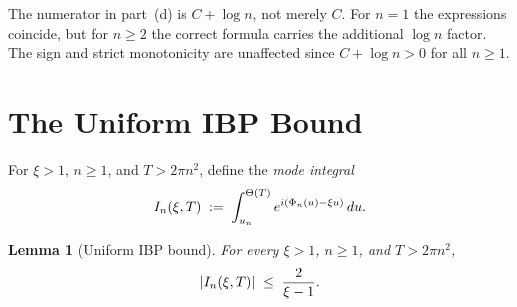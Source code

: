 \documentclass{amsart}
\newcommand{\assign}{:=}
\newcommand{\tmem}[1]{{\em #1\/}}
\newtheorem{lemma}{Lemma}
\newcommand{\abs}[1]{\left| #1 \right|}
\begin{document}
\begin{remark}
  \label{rem:formula-d}The numerator in part~(d) is $C + \log n$, not merely
  $C$. For $n = 1$ the expressions coincide, but for $n \ge 2$ the correct
  formula carries the additional $\log n$ factor. The sign and strict
  monotonicity are unaffected since $C + \log n > 0$ for all $n \ge 1$.
\end{remark}

\section{The Uniform IBP Bound}

For $\xi > 1$, $n \ge 1$, and $T > 2 \pi n^2$, define the {\tmem{mode
integral}}
\begin{equation}
  \label{eq:In} I_n (\xi, T) \hspace{0.27em} \assign \hspace{0.27em}
  \int_{u_n}^{\Theta (T)} e^{i (\Phi_n (u) - \xi u)}  \hspace{0.17em} du.
\end{equation}
\begin{lemma}
  [Uniform IBP bound]\label{lem:IBP} For every $\xi > 1$, $n \ge 1$, and $T >
  2 \pi n^2$,
  \[ \abs{I_n (\xi, T)} \hspace{0.27em} \le \hspace{0.27em} \frac{2}{\xi - 1}
     . \]
\end{lemma}
\end{document}
